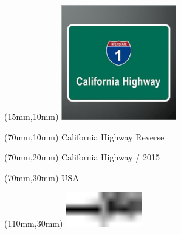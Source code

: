 \null\newpage
\begin{textblock*}{50mm}(15mm,10mm)%
\includegraphics[width=50mm]{LG/2015-05-20_00077.png}
\end{textblock*}
\begin{textblock*}{130mm}(70mm,10mm)%
{\fontsize{20}{20}\selectfont California Highway Reverse}\\
\end{textblock*}
\begin{textblock*}{120mm}(70mm,20mm)%
{\fontsize{16}{16}\selectfont California Highway / 2015}\\
\end{textblock*}
\begin{textblock*}{120mm}(70mm,30mm)%
{\fontsize{12}{12}\selectfont USA}
\end{textblock*}
\begin{textblock*}{30mm}(110mm,30mm)%
\centering
\includegraphics[height=15mm]{icons/tofinish.pdf}
\end{textblock*}
